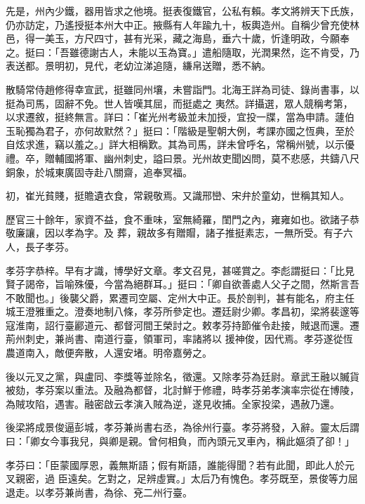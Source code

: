 \begin{pinyinscope}
 先是，州內少鐵，器用皆求之他境。挺表復鐵官，公私有賴。孝文將辨天下氏族，仍亦訪定，乃遙授挺本州大中正。掖縣有人年踰九十，板輿造州。自稱少曾充使林邑，得一美玉，方尺四寸，甚有光采，藏之海島，垂六十歲，忻逢明政，今願奉之。挺曰：「吾雖德謝古人，未能以玉為寶。」遣船隨取，光潤果然，迄不肯受，乃表送都。景明初，見代，老幼泣涕追隨，縑帛送贈，悉不納。



 散騎常侍趙修得幸宣武，挺雖同州壤，未嘗詣門。北海王詳為司徒、錄尚書事，以挺為司馬，固辭不免。世人皆嘆其屈，而挺處之
 夷然。詳攝選，眾人競稱考第，以求遷敘，挺終無言。詳曰：「崔光州考級並未加授，宜投一牒，當為申請。蘧伯玉恥獨為君子，亦何故默然？」挺曰：「階級是聖朝大例，考課亦國之恆典，至於自炫求進，竊以羞之。」詳大相稱歎。其為司馬，詳未曾呼名，常稱州號，以示優禮。卒，贈輔國將軍、幽州刺史，謚曰景。光州故吏聞凶問，莫不悲感，共鑄八尺銅象，於城東廣固寺赴八關齋，追奉冥福。



 初，崔光貧賤，挺贍遺衣食，常親敬焉。又識邢巒、宋弁於童幼，世稱其知人。



 歷官三十餘年，家資不益，食不重味，室無綺羅，閨門之內，雍雍如也。欲諸子恭敬廉讓，因以孝為字。及
 葬，親故多有贈賵，諸子推挺素志，一無所受。有子六人，長子孝芬。



 孝芬字恭梓。早有才識，博學好文章。孝文召見，甚嗟賞之。李彪謂挺曰：「比見賢子謁帝，旨喻殊優，今當為絕群耳。」挺曰：「卿自欲善處人父子之間，然斯言吾不敢聞也。」後襲父爵，累遷司空屬、定州大中正。長於剖判，甚有能名，府主任城王澄雅重之。澄奏地制八條，孝芬所參定也。遷廷尉少卿。孝昌初，梁將裴邃等寇淮南，詔行臺酈道元、都督河間王榮討之。敕孝芬持節催令赴接，賊退而還。遷荊州刺史，兼尚書、南道行臺，領軍司，率諸將以
 援神俊，因代焉。孝芬遂從恆農道南入，敵便奔散，人還安堵。明帝嘉勞之。



 後以元叉之黨，與盧同、李獎等並除名，徵還。又除孝芬為廷尉。章武王融以贓貨被劾，孝芬案以重法。及融為都督，北討鮮于修禮，時孝芬弟孝演率宗從在博陵，為賊攻陷，遇害。融密啟云孝演入賊為逆，遂見收捕。全家投梁，遇赦乃還。



 後梁將成景俊逼彭城，孝芬兼尚書右丞，為徐州行臺。孝芬將發，入辭。靈太后謂曰：「卿女今事我兒，與卿是親。曾何相負，而內頭元叉車內，稱此嫗須了卻！」



 孝芬曰：「臣蒙國厚恩，義無斯語；假有斯語，誰能得聞？若有此聞，即此人於元叉親密，過
 臣遠矣。乞對之，足辨虛實。」太后乃有愧色。孝芬既至，景俊等力屈退走。以孝芬兼尚書，為徐、兗二州行臺。




\end{pinyinscope}
